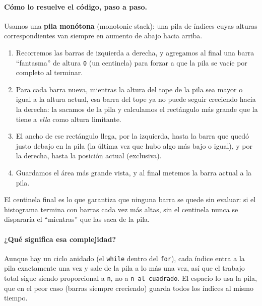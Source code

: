 \paragraph{Cómo lo resuelve el código, paso a paso.} Usamos una
\textbf{pila monótona} (monotonic stack): una pila de índices cuyas alturas
correspondientes van siempre en aumento de abajo hacia arriba.
\begin{enumerate}
  \item Recorremos las barras de izquierda a derecha, y agregamos al final
        una barra ``fantasma'' de altura \texttt{0} (un centinela) para
        forzar a que la pila se vacíe por completo al terminar.
  \item Para cada barra nueva, mientras la altura del tope de la pila sea
        mayor o igual a la altura actual, esa barra del tope ya no puede
        seguir creciendo hacia la derecha: la sacamos de la pila y
        calculamos el rectángulo más grande que la tiene a \emph{ella}
        como altura limitante.
  \item El ancho de ese rectángulo llega, por la izquierda, hasta la barra
        que quedó justo debajo en la pila (la última vez que hubo algo más
        bajo o igual), y por la derecha, hasta la posición actual
        (exclusiva).
  \item Guardamos el área más grande vista, y al final metemos la barra
        actual a la pila.
\end{enumerate}
El centinela final es lo que garantiza que ninguna barra se quede sin
evaluar: si el histograma termina con barras cada vez más altas, sin el
centinela nunca se dispararía el ``mientras'' que las saca de la pila.




\paragraph{¿Qué significa esa complejidad?} Aunque hay un ciclo anidado
(el \texttt{while} dentro del \texttt{for}), cada índice entra a la pila
exactamente una vez y sale de la pila a lo más una vez, así que el trabajo
total sigue siendo proporcional a \texttt{n}, no a \texttt{n al cuadrado}.
El espacio lo usa la pila, que en el peor caso (barras siempre creciendo)
guarda todos los índices al mismo tiempo.

